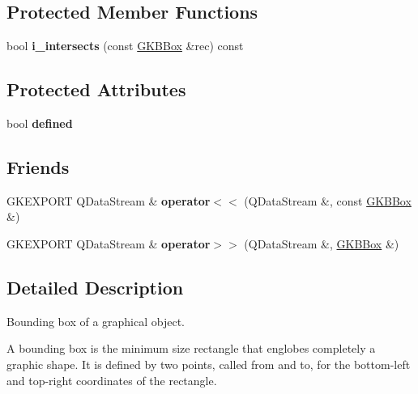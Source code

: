 \subsection*{Protected Member Functions}
\begin{DoxyCompactItemize}
\item 
bool {\bfseries i\+\_\+intersects} (const \hyperlink{classGKBBox}{G\+K\+B\+Box} \&rec) const \hypertarget{classGKBBox_a13f61a846ae084bbcf71b412d370d837}{}\label{classGKBBox_a13f61a846ae084bbcf71b412d370d837}

\end{DoxyCompactItemize}
\subsection*{Protected Attributes}
\begin{DoxyCompactItemize}
\item 
bool {\bfseries defined}\hypertarget{classGKBBox_a80f0f3648b816f6d102694b9bf86e1fd}{}\label{classGKBBox_a80f0f3648b816f6d102694b9bf86e1fd}

\end{DoxyCompactItemize}
\subsection*{Friends}
\begin{DoxyCompactItemize}
\item 
G\+K\+E\+X\+P\+O\+RT Q\+Data\+Stream \& {\bfseries operator$<$$<$} (Q\+Data\+Stream \&, const \hyperlink{classGKBBox}{G\+K\+B\+Box} \&)\hypertarget{classGKBBox_a1977a20f83fb0e1b9b7c43e6cf5eb736}{}\label{classGKBBox_a1977a20f83fb0e1b9b7c43e6cf5eb736}

\item 
G\+K\+E\+X\+P\+O\+RT Q\+Data\+Stream \& {\bfseries operator$>$$>$} (Q\+Data\+Stream \&, \hyperlink{classGKBBox}{G\+K\+B\+Box} \&)\hypertarget{classGKBBox_a3e8e7ddd034b096c780ce264833524c2}{}\label{classGKBBox_a3e8e7ddd034b096c780ce264833524c2}

\end{DoxyCompactItemize}


\subsection{Detailed Description}
Bounding box of a graphical object. 

A bounding box is the minimum size rectangle that englobes completely a graphic shape. It is defined by two points, called from and to, for the bottom-\/left and top-\/right coordinates of the rectangle.

